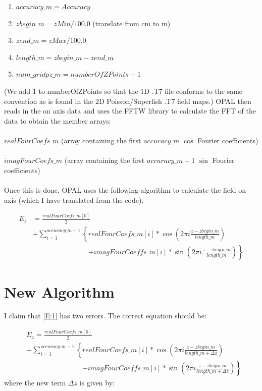 \documentclass{report}
\begin{document}
\begin{enumerate}
\item $accuracy\_m = Accuracy$
\item $zbegin\_m = zMin / 100.0$ (translate from cm to m)
\item $zend\_m = zMax / 100.0$
\item $length\_m = zbegin\_m - zend\_m$
\item $num\_gridpz\_m = numberOfZPoints + 1$
\end{enumerate}
(We add 1 to numberOfZPoints so that the 1D .T7 file conforms to the same convention as is
found in the 2D Poisson/Superfish .T7 field maps.) OPAL then reads in the on axis data and uses the FFTW library to calculate
the FFT of the data to obtain the member arrays:\\ \\
$realFourCoefs\_m$ (array containing the first $accuracy\_m$ $\cos$ Fourier coefficients) \\ \\
$imagFourCoefs\_m$ (array containing the first $accuracy\_m - 1$ $\sin$ Fourier coefficients) \\
\\
Once this is done, OPAL uses the following algorithm to calculate the field on axis (which I have translated from
the code).

\begin{equation}\label{E:1}
  \begin{split}
    E_{z} &= \frac{realFourCoefs\_m[0]}{2} \\
    &+ \sum_{i=1}^{accuracy\_m - 1} \left\{realFourCoefs\_m[i] * \cos \left(2 \pi i \frac{z - zbegin\_m}{length\_m}\right) \right.\\
    &\phantom{+ \sum_{i=1}^{accuracy\_m - 1} \left\{\right.}
    \left. + imagFourCoeffs\_m[i] * \sin \left(2 \pi i \frac{z - zbegin\_m}{length\_m}\right) \right\}
  \end{split}
\end{equation}

\section {New Algorithm}
I claim that \eqref{E:1} has two errors. The correct equation should be:

\begin{equation}\label{E:2}
  \begin{split}
    &E_{z} = \frac{realFourCoefs\_m[0]}{2} \\
    &+ \sum_{i=1}^{accuracy\_m - 1} \left\{realFourCoefs\_m[i] * \cos \left(2 \pi i \frac{z - zbegin\_m}{length\_m
          + \Delta z}\right) \right.\\
    &\phantom{+ \sum_{i=1}^{accuracy\_m - 1} \left\{\right.}
    \left. - imagFourCoeffs\_m[i] * \sin \left(2 \pi i \frac{z - zbegin\_m}{length\_m + \Delta z}\right) \right\}
  \end{split}
\end{equation}
where the new term $\Delta z$ is given by:
\end{document}
